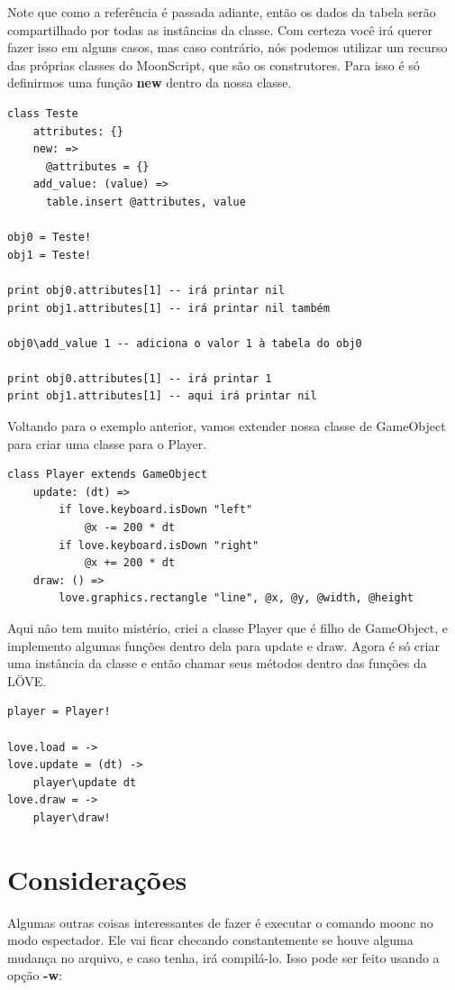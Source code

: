 \documentclass[a4paper,oneside,12pt]{article}
\newcommand{\mybox}[1]{
    \colorbox{backcolour}{\textbf{#1}}
}
\begin{document}
Note que como a referência é passada adiante, então os dados da tabela serão compartilhado por todas as instâncias da classe. Com certeza você irá querer fazer isso em alguns casos, mas caso contrário, nós podemos utilizar um recurso das próprias classes do MoonScript, que são os construtores. Para isso é só definirmos uma função \mybox{new} dentro da nossa classe.

\begin{lstlisting}
class Teste
    attributes: {}
    new: =>
      @attributes = {}
    add_value: (value) =>
      table.insert @attributes, value
      
obj0 = Teste!
obj1 = Teste!

print obj0.attributes[1] -- irá printar nil
print obj1.attributes[1] -- irá printar nil também

obj0\add_value 1 -- adiciona o valor 1 à tabela do obj0
  
print obj0.attributes[1] -- irá printar 1
print obj1.attributes[1] -- aqui irá printar nil
\end{lstlisting}

Voltando para o exemplo anterior, vamos extender nossa classe de GameObject para criar uma classe para o Player.

\begin{lstlisting}
class Player extends GameObject
    update: (dt) =>
        if love.keyboard.isDown "left"
            @x -= 200 * dt
        if love.keyboard.isDown "right"
            @x += 200 * dt
    draw: () =>
        love.graphics.rectangle "line", @x, @y, @width, @height
\end{lstlisting}

Aqui não tem muito mistério, criei a classe Player que é filho de GameObject, e implemento algumas funções dentro dela para update e draw. Agora é só criar uma instância da classe e então chamar seus métodos dentro das funções da LÖVE.

\begin{lstlisting}
player = Player!

love.load = ->
love.update = (dt) ->
    player\update dt
love.draw = ->
    player\draw!
\end{lstlisting}

\section{Considerações}

Algumas outras coisas interessantes de fazer é executar o comando moonc no modo espectador. Ele vai ficar checando constantemente se houve alguma mudança no arquivo, e caso tenha, irá compilá-lo. Isso pode ser feito usando a opção \textbf{-w}:
\end{document}
